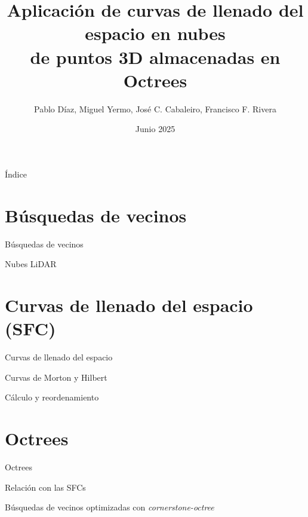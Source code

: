 \documentclass[aspectratio=169]{beamer}
\title{Aplicación de curvas de llenado del espacio en nubes \\ de puntos 3D almacenadas en Octrees}
\author{Pablo Díaz, Miguel Yermo, José C. Cabaleiro, Francisco F. Rivera}
\date{Junio 2025}
\def\toctitle{Índice}
\begin{document}
\begin{frame}[plain]%
    \titlepage%
\end{frame}
  
\begin{frame}[plain]{\toctitle}
    \tableofcontents
\end{frame}
\setcounter{framenumber}{0} %

\section{Búsquedas de vecinos}

\begin{frame}{Búsquedas de vecinos}

\end{frame}

\begin{frame}{Nubes LiDAR}

\end{frame}

\section{Curvas de llenado del espacio (SFC)}
\begin{frame}{Curvas de llenado del espacio}
    
\end{frame}

\begin{frame}{Curvas de Morton y Hilbert}
    
\end{frame}

\begin{frame}{Cálculo y reordenamiento}
    
\end{frame}

\section{Octrees}
\begin{frame}{Octrees}
    
\end{frame}

\begin{frame}{Relación con las SFCs}
    
\end{frame}

\begin{frame}{Búsquedas de vecinos optimizadas con \textit{cornerstone-octree}}
    
\end{frame}
\end{document}
